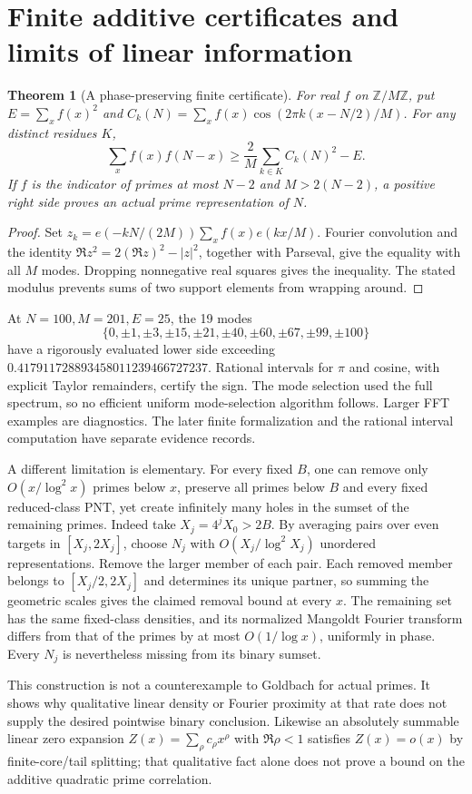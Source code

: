 \documentclass[11pt,a4paper]{article}
\newtheorem{theorem}{Theorem}[section]
\theoremstyle{definition}
\theoremstyle{remark}
\begin{document}
\section{Finite additive certificates and limits of linear information}\label{sec:certificates}
\begin{theorem}[A phase-preserving finite certificate]\label{thm:additive-certificate}
For real $f$ on $\mathbb Z/M\mathbb Z$, put $E=\sum_xf(x)^2$ and
$C_k(N)=\sum_xf(x)\cos(2\pi k(x-N/2)/M)$. For any distinct residues $K$,
\[\sum_xf(x)f(N-x)\ge\frac2M\sum_{k\in K}C_k(N)^2-E.\]
If $f$ is the indicator of primes at most $N-2$ and $M>2(N-2)$, a positive right side proves an actual prime representation of $N$.
\end{theorem}
\begin{proof}
Set $z_k=e(-kN/(2M))\sum_xf(x)e(kx/M)$. Fourier convolution and the identity $\Re z^2=2(\Re z)^2-|z|^2$, together with Parseval, give the equality with all $M$ modes. Dropping nonnegative real squares gives the inequality. The stated modulus prevents sums of two support elements from wrapping around.
\end{proof}
At $N=100,M=201,E=25$, the 19 modes
\[\{0,\pm1,\pm3,\pm15,\pm21,\pm40,\pm60,\pm67,\pm99,\pm100\}\]
have a rigorously evaluated lower side exceeding $0.417911728893458011239466727237$. Rational intervals for $\pi$ and cosine, with explicit Taylor remainders, certify the sign. The mode selection used the full spectrum, so no efficient uniform mode-selection algorithm follows. Larger FFT examples are diagnostics. The later finite formalization and the rational interval computation have separate evidence records.

A different limitation is elementary. For every fixed $B$, one can remove only $O(x/\log^2x)$ primes below $x$, preserve all primes below $B$ and every fixed reduced-class PNT, yet create infinitely many holes in the sumset of the remaining primes. Indeed take $X_j=4^jX_0>2B$. By averaging pairs over even targets in $[X_j,2X_j]$, choose $N_j$ with $O(X_j/\log^2X_j)$ unordered representations. Remove the larger member of each pair. Each removed member belongs to $[X_j/2,2X_j]$ and determines its unique partner, so summing the geometric scales gives the claimed removal bound at every $x$. The remaining set has the same fixed-class densities, and its normalized Mangoldt Fourier transform differs from that of the primes by at most $O(1/\log x)$, uniformly in phase. Every $N_j$ is nevertheless missing from its binary sumset.

This construction is not a counterexample to Goldbach for actual primes. It shows why qualitative linear density or Fourier proximity at that rate does not supply the desired pointwise binary conclusion. Likewise an absolutely summable linear zero expansion $Z(x)=\sum_\rho c_\rho x^\rho$ with $\Re\rho<1$ satisfies $Z(x)=o(x)$ by finite-core/tail splitting; that qualitative fact alone does not prove a bound on the additive quadratic prime correlation.
\end{document}
